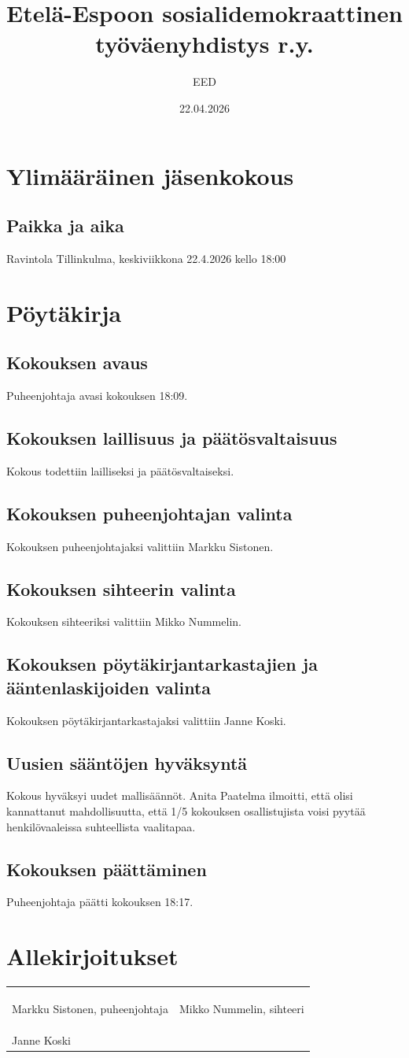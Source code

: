 \documentclass[a4paper,12pt]{article}
\title{Etelä-Espoon sosialidemokraattinen työväenyhdistys r.y.}
\author{EED}
\date{22.04.2026}
\begin{document}
\maketitle
\tableofcontents
\section*{Ylimääräinen jäsenkokous}
\subsection*{Paikka ja aika}
Ravintola Tillinkulma, keskiviikkona 22.4.2026 kello 18:00
\section*{Pöytäkirja}
\subsection{Kokouksen avaus}
Puheenjohtaja avasi kokouksen 18:09.
\subsection{Kokouksen laillisuus ja päätösvaltaisuus}
Kokous todettiin lailliseksi ja päätösvaltaiseksi.
\subsection{Kokouksen puheenjohtajan valinta}
Kokouksen puheenjohtajaksi valittiin Markku Sistonen.
\subsection{Kokouksen sihteerin valinta}
Kokouksen sihteeriksi valittiin Mikko Nummelin.
\subsection{Kokouksen pöytäkirjantarkastajien ja ääntenlaskijoiden valinta}
Kokouksen pöytäkirjantarkastajaksi valittiin Janne Koski.
\subsection{Uusien sääntöjen hyväksyntä}
Kokous hyväksyi uudet mallisäännöt. Anita Paatelma ilmoitti, että olisi kannattanut mahdollisuutta, että 1/5 kokouksen osallistujista voisi pyytää henkilövaaleissa
suhteellista vaalitapaa.
\subsection{Kokouksen päättäminen}
Puheenjohtaja päätti kokouksen 18:17.
\section*{Allekirjoitukset}
\begin{flushleft}
\begin{tabular}{ll}
& \\
& \\
& \\
Markku Sistonen, puheenjohtaja &
Mikko Nummelin, sihteeri \\
& \\
& \\
& \\
Janne Koski
\end{tabular}
\end{flushleft}
\end{document}
